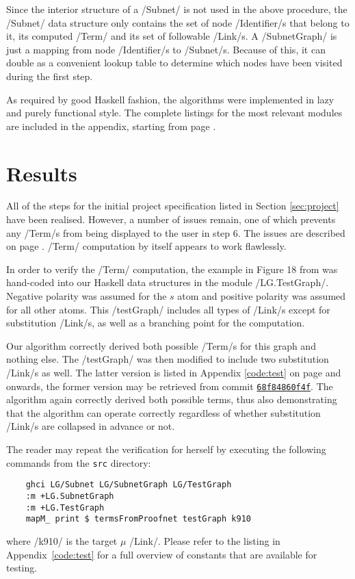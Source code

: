 \documentclass[12pt,a4paper]{article}
\begin{document}
Since the interior structure of a \hs/Subnet/ is not used in the above procedure, the \hs/Subnet/ data structure only contains the set of node \hs/Identifier/s that belong to it, its computed \hs/Term/ and its set of followable \hs/Link/s. A \hs/SubnetGraph/ is just a mapping from node \hs/Identifier/s to \hs/Subnet/s. Because of this, it can double as a convenient lookup table to determine which nodes have been visited during the first step.

As required by good Haskell fashion, the algorithms were implemented in lazy and purely functional style. The complete listings for the most relevant modules are included in the appendix, starting from page \pageref{code}.


\section{Results}

All of the steps for the initial project specification listed in Section \ref{sec:project} have been realised. However, a number of issues remain, one of which prevents any \hs/Term/s from being displayed to the user in step 6. The issues are described on page \pageref{sub:issues}. \hs/Term/ computation by itself appears to work flawlessly.

In order to verify the \hs/Term/ computation, the example in Figure 18 from \cite[p.~28]{mm12} was hand-coded into our Haskell data structures in the module \hs/LG.TestGraph/. Negative polarity was assumed for the $s$ atom and positive polarity was assumed for all other atoms. This \hs/testGraph/ includes all types of \hs/Link/s except for substitution \hs/Link/s, as well as a branching point for the computation.

Our algorithm correctly derived both possible \hs/Term/s for this graph and nothing else. The \hs/testGraph/ was then modified to include two substitution \hs/Link/s as well. The latter version is listed in Appendix \ref{code:test} on page \pageref{code:test} and onwards, the former version may be retrieved from commit \href{https://github.com/jgonggrijp/net-prove/blob/68f84860f4f9535e15a12161f5120fb25f6b4219/src/LG/TestGraph.hs}{\texttt{68f84860f4f}}. The algorithm again correctly derived both possible terms, thus also demonstrating that the algorithm can operate correctly regardless of whether substitution \hs/Link/s are collapsed in advance or not.

The reader may repeat the verification for herself by executing the following commands from the \texttt{src} directory:
\begin{verbatim}
    ghci LG/Subnet LG/SubnetGraph LG/TestGraph
    :m +LG.SubnetGraph 
    :m +LG.TestGraph
    mapM_ print $ termsFromProofnet testGraph k910
\end{verbatim}
where \hs/k910/ is the target $\mu$ \hs/Link/. Please refer to the listing in Appendix~\ref{code:test} for a full overview of constants that are available for testing.
\end{document}
